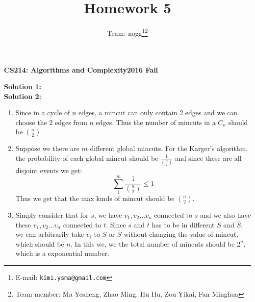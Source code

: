 \documentclass[12pt, notitlepage]{article}
\title{Homework 5}
\author{Team: nogg\footnote{E-mail: \texttt{kimi.ysma@gmail.com}}\footnote{Team member: Ma Yesheng, Zhao Ming, Hu Hu, Zou Yikai, Fan Minghua}}
\begin{document}
{\bf\small CS214: Algorithms and Complexity}\hfill{\bf\small 2016 Fall}
{\let\newpage\relax\maketitle}

\textbf{Solution 1:}\\

\textbf{Solution 2:}\\
\begin{enumerate}[1.]
\item Since in a cycle of $n$ edges, a mincut can only contain $2$ edges
    and we can choose the $2$ edges from $n$ edges. Thus the number of
        mincuts in a $C_n$ should be $\binom{n}{2}$
\item Suppose we there are $m$ different global mincuts. For the Karger's algorithm, the probability of each global mincut
    should be $\frac{1}{\binom{n}{2}}$ and since these are all disjoint events we get:
        \[
            \sum_{1}^{m} \frac{1}{\binom{n}{2}} \leq 1
            \]
        Thus we get that the max kinds of mincut should be $\binom{n}{2}$.

\item Simply consider that for $s$, we have $v_1, v_2 \ldots v_n$ connected to $s$ and we also have these
    $v_1, v_2 \ldots v_n$ connected to $t$. Since $s$ and $t$ has to be in different $S$ and $\overline{S}$,
    we can arbitrarily take $v_i$ to $S$ or $\overline{S}$ without changing the value of mincut, which should be $n$.
    In this we, we the total number of mincuts should be $2^n$, which is a exponential number.
\end{enumerate}
\end{document}
